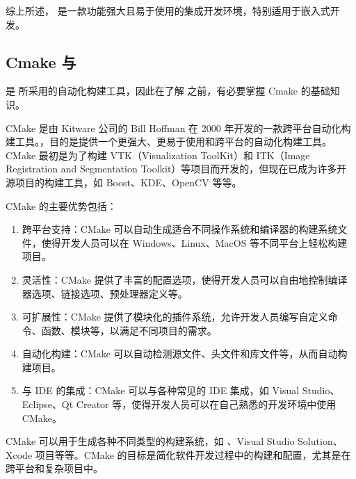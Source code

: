 \documentclass[a4paper,12pt,english]{sphinxmanual}
\begin{document}
\sphinxAtStartPar
综上所述， 是一款功能强大且易于使用的集成开发环境，特别适用于嵌入式开发。


\subsection{Cmake 与 }
\label{\detokenize{dev-board/clion:cmake-makefile}}
\sphinxAtStartPar
{}是  所采用的自动化构建工具，因此在了解  之前，有必要掌握 Cmake 的基础知识。

\sphinxAtStartPar
CMake 是由 Kitware 公司的 Bill Hoffman 在 2000 年开发的一款跨平台自动化构建工具。，目的是提供一个更强大、更易于使用和跨平台的自动化构建工具。CMake 最初是为了构建 VTK（Visualization ToolKit）和 ITK（Image Registration and Segmentation Toolkit）等项目而开发的，但现在已成为许多开源项目的构建工具，如 Boost、KDE、OpenCV 等等。

\sphinxAtStartPar
CMake 的主要优势包括：
\begin{enumerate}
%
\item {} 
\sphinxAtStartPar
跨平台支持：CMake 可以自动生成适合不同操作系统和编译器的构建系统文件，使得开发人员可以在 Windows、Linux、MacOS 等不同平台上轻松构建项目。

\item {} 
\sphinxAtStartPar
灵活性：CMake 提供了丰富的配置选项，使得开发人员可以自由地控制编译器选项、链接选项、预处理器定义等。

\item {} 
\sphinxAtStartPar
可扩展性：CMake 提供了模块化的插件系统，允许开发人员编写自定义命令、函数、模块等，以满足不同项目的需求。

\item {} 
\sphinxAtStartPar
自动化构建：CMake 可以自动检测源文件、头文件和库文件等，从而自动构建项目。

\item {} 
\sphinxAtStartPar
与 IDE 的集成：CMake 可以与各种常见的 IDE 集成，如 Visual Studio、Eclipse、Qt Creator 等，使得开发人员可以在自己熟悉的开发环境中使用 CMake。

\end{enumerate}

\sphinxAtStartPar
CMake 可以用于生成各种不同类型的构建系统，如 、Visual Studio Solution、Xcode 项目等等。CMake 的目标是简化软件开发过程中的构建和配置，尤其是在跨平台和复杂项目中。
\end{document}
